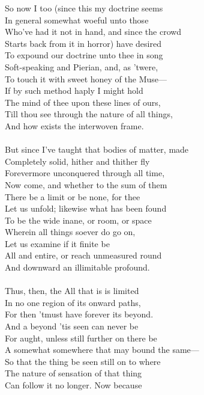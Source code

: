 So now I too (since this my doctrine seems\\
In general somewhat woeful unto those\\
Who've had it not in hand, and since the crowd\\
Starts back from it in horror) have desired\\
To expound our doctrine unto thee in song\\
Soft-speaking and Pierian, and, as 'twere,\\
To touch it with sweet honey of the Muse—\\
If by such method haply I might hold\\
The mind of thee upon these lines of ours,\\
Till thou see through the nature of all things,\\
And how exists the interwoven frame.\\
\\
But since I've taught that bodies of matter, made\\
Completely solid, hither and thither fly\\
Forevermore unconquered through all time,\\
Now come, and whether to the sum of them\\
There be a limit or be none, for thee\\
Let us unfold; likewise what has been found\\
To be the wide inane, or room, or space\\
Wherein all things soever do go on,\\
Let us examine if it finite be\\
All and entire, or reach unmeasured round\\
And downward an illimitable profound.\\
\\
Thus, then, the All that is is limited\\
In no one region of its onward paths,\\
For then 'tmust have forever its beyond.\\
And a beyond 'tis seen can never be\\
For aught, unless still further on there be\\
A somewhat somewhere that may bound the same—\\
So that the thing be seen still on to where\\
The nature of sensation of that thing\\
Can follow it no longer. Now because\\

